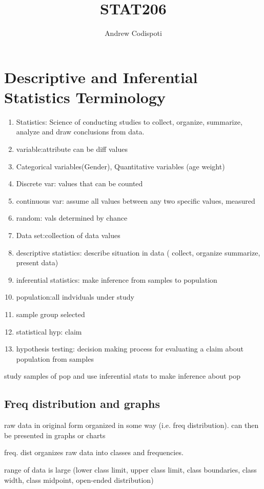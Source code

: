 \documentclass[11pt]{amsart}
\title{STAT206}
\author{Andrew Codispoti}
\begin{document}
\maketitle
\section{Descriptive and Inferential Statistics Terminology}
\begin{enumerate}
  \item Statistics: Science of conducting studies to collect, organize,
    summarize, analyze and draw conclusions from data.
  \item
    variable:attribute can be diff values
  \item Categorical variables(Gender), Quantitative variables (age weight)
  \item Discrete var: values that can be counted
  \item continuous var: assume all values between any two specific values,
    measured
  \item random: vals determined by chance
  \item Data set:collection of data values
  \item descriptive statistics: describe situation in data ( collect,
    organize summarize, present data)
  \item inferential statistics: make inference from samples to population
  \item population:all indviduals under study
  \item sample group selected
  \item statistical hyp: claim
  \item hypothesis testing: decision making process for evaluating a
    claim about population from samples
\end{enumerate}
\par study samples of pop and use inferential stats to make inference
about pop
\subsection{Freq distribution and graphs}
\par raw data in original form organized in some way  (i.e. freq
distribution). can then be presented in graphs or charts
\par freq. dist organizes raw data into classes and frequencies.
\par range of data is large (lower class limit, upper class limit, class
boundaries, class width, class midpoint, open-ended distribution)
\end{document}
